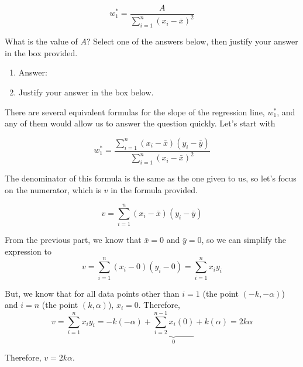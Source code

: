 \documentclass[11pt]{article}
\begin{document}
\begin{prob}
\begin{subprob}
$$w_1^* = \frac{A}{\sum_{i=1}^n (x_i - \bar{x})^2}$$

What is the value of $A$? Select one of the answers below, then justify your answer in the box provided.

\begin{enumerate}
    \item Answer: \:  \bubble{$\displaystyle \alpha$} \bubble{$\displaystyle 2 \alpha$}   
    \item Justify your answer in the box below. \\  \emptybox{6.5cm}{}
\end{enumerate}

\begin{solution}
There are several equivalent formulas for the slope of the regression line, $w_1^*$, and any of them would allow us to answer the question quickly. Let's start with

$$w_1^* = \frac{\sum_{i=1}^n (x_i - \bar{x})(y_i - \bar{y})}{\sum_{i=1}^n (x_i - \bar{x})^2}$$

The denominator of this formula is the same as the one given to us, so let's focus on the numerator, which is $v$ in the formula provided.

$$v = \sum_{i=1}^n (x_i - \bar{x})(y_i - \bar{y})$$

From the previous part, we know that $\bar{x} = 0$ and $\bar{y} = 0$, so we can simplify the expression to
$$v = \sum_{i=1}^n (x_i - 0)(y_i - 0) = \sum_{i=1}^n x_i y_i$$

But, we know that for all data points other than $i=1$ (the point $(-k, -\alpha)$) and $i=n$ (the point $(k, \alpha)$), $x_i = 0$. Therefore,
$$v = \sum_{i = 1}^n x_iy_i = -k(-\alpha) + \underbrace{\sum_{i = 2}^{n-1} x_i (0)}_{0} + k(\alpha) = 2k\alpha$$

Therefore, $v = \boxed{2k\alpha}$.

\end{solution}

\end{subprob}




\end{prob}
\end{document}
